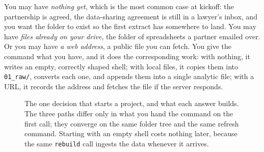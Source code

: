 \documentclass[
    a4paper,
    fontsize=10pt,
    twoside=true,
    numbers=noenddot,
]{kaobook}
\begin{document}
You may have \emph{nothing yet}, which is the most common case at kickoff: the partnership is agreed, the data-sharing agreement is still in a lawyer's inbox, and you want the folder to exist so the first extract has somewhere to land. You may have \emph{files already on your drive}, the folder of spreadsheets a partner emailed over. Or you may have \emph{a web address}, a public file you can fetch. You give the command what you have, and it does the corresponding work: with nothing, it writes an empty, correctly shaped shell; with local files, it copies them into \texttt{01\_raw/}, converts each one, and appends them into a single analytic file; with a URL, it records the address and fetches the file if the server responds.

\begin{figure}[htbp]
\centering
{}
\caption[Three ways to start a project]{The one decision that starts a project, and what each answer builds. The three paths differ only in what you hand the command on the first call; they converge on the same folder tree and the same refresh command. Starting with an empty shell costs nothing later, because the same \texttt{rebuild} call ingests the data whenever it arrives.}
\label{fig:ch02-viz-pbpaths}
\end{figure}
\end{document}
